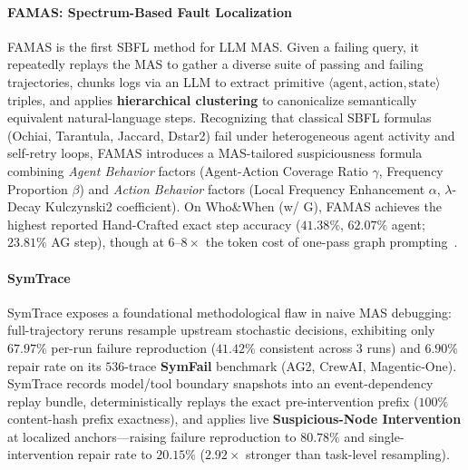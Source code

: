 \paragraph{FAMAS: Spectrum-Based Fault Localization~\citep{ge2025famas}}
FAMAS is the first SBFL method for LLM MAS. Given a failing query, it repeatedly replays the MAS to gather a diverse suite of passing and failing trajectories, chunks logs via an LLM to extract primitive $\langle\text{agent}, \text{action}, \text{state}\rangle$ triples, and applies \textbf{hierarchical clustering} to canonicalize semantically equivalent natural-language steps. Recognizing that classical SBFL formulas (Ochiai, Tarantula, Jaccard, Dstar2) fail under heterogeneous agent activity and self-retry loops, FAMAS introduces a MAS-tailored suspiciousness formula combining \emph{Agent Behavior} factors (Agent-Action Coverage Ratio $\gamma$, Frequency Proportion $\beta$) and \emph{Action Behavior} factors (Local Frequency Enhancement $\alpha$, $\lambda$-Decay Kulczynski2 coefficient). On Who\&When (w/ G), FAMAS achieves the highest reported Hand-Crafted exact step accuracy ($41.38\%$, $62.07\%$ agent; $23.81\%$ AG step), though at $6$--$8\times$ the token cost of one-pass graph prompting~\citep{wang2026chief}.

\paragraph{SymTrace~\citep{luan2026symtrace}}
SymTrace exposes a foundational methodological flaw in naive MAS debugging: full-trajectory reruns resample upstream stochastic decisions, exhibiting only $67.97\%$ per-run failure reproduction ($41.42\%$ consistent across $3$ runs) and $6.90\%$ repair rate on its $536$-trace \textbf{SymFail} benchmark (AG2, CrewAI, Magentic-One). SymTrace records model/tool boundary snapshots into an event-dependency replay bundle, deterministically replays the exact pre-intervention prefix ($100\%$ content-hash prefix exactness), and applies live \textbf{Suspicious-Node Intervention} at localized anchors---raising failure reproduction to $80.78\%$ and single-intervention repair rate to $20.15\%$ ($2.92\times$ stronger than task-level resampling).

